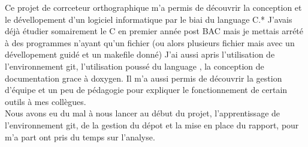 Ce projet de corrceteur orthographique m'a permis de découvrir la conception et le dévellopement d'un logiciel informatique par le biai du language C.*
J'avais déjà étudier somairement le C en premier année post BAC mais je mettais arrété à des programmes n'ayant qu'un fichier (ou alors plusieurs fichier mais avec un dévellopement guidé et un makefile donné)
J'ai aussi apris l'utilisation de l'environnement git, l'utilisation poussé du language \Latex, la conception de documentation grace à doxygen. 
Il m'a aussi permis de découvrir la gestion d'équipe et un peu de pédagogie pour expliquer le fonctionnement de certain outils à  mes collègues.\\
Nous avons eu du mal à nous lancer au début du projet, l'apprentissage de l'environnement git, de la gestion du dépot et la mise en place du rapport, 
pour m'a part ont pris du temps sur l'analyse.\\
